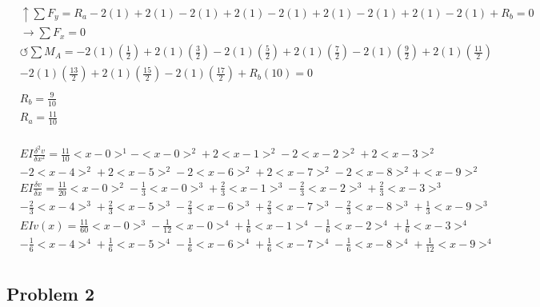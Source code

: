 \documentclass[a4paper]{article}
\begin{document}
\begin{equation}
\begin{split}
	&\uparrow \sum F_y = R_a - 2(1) + 2(1) - 2(1) + 2(1) - 2(1) + 2(1) - 2(1) + 2(1) - 2(1) + R_b = 0 \\
 	&\rightarrow \sum F_x = 0 \\
 	&\circlearrowleft \sum M_A = -2(1)\left(\frac{1}{2}\right) + 2(1)\left(\frac{3}{2}\right) - 2(1)\left(\frac{5}{2}\right) + 2(1)\left(\frac{7}{2}\right) - 2(1)\left(\frac{9}{2}\right) + 2(1)\left(\frac{11}{2}\right) \\ 
	& - 2(1)\left(\frac{13}{2}\right) + 2(1)\left(\frac{15}{2}\right) - 2(1)\left(\frac{17}{2}\right) + R_b(10) = 0 \\
	& \\
	& R_b = \frac{9}{10} \\
	& R_a = \frac{11}{10} \\
\end{split}
\label{problem1_reaction_solution}
\end{equation}

\begin{equation}
    \begin{split}
    & EI \frac{\delta^2 v}{\delta x^2} = \frac{11}{10}<x-0>^1 - <x-0>^2 +  2<x-1>^2 - 2<x-2>^2 +  2<x-3>^2 \\
    & - 2<x-4>^2  +  2<x-5>^2 - 2<x-6>^2  +  2<x-7>^2 - 2<x-8>^2 +  <x-9>^2  \\
    & EI \frac{\delta v}{\delta x} =  \frac{11}{20}<x-0>^2 - \frac{1}{3}<x-0>^3 +  \frac{2}{3}<x-1>^3 - \frac{2}{3}<x-2>^3 +  \frac{2}{3}<x-3>^3 \\
    & - \frac{2}{3}<x-4>^3  +  \frac{2}{3}<x-5>^3 - \frac{2}{3}<x-6>^3  +  \frac{2}{3}<x-7>^3 - \frac{2}{3}<x-8>^3 +  \frac{1}{3}<x-9>^3  \\
    & EI v(x) = \frac{11}{60}<x-0>^3 - \frac{1}{12}<x-0>^4 +  \frac{1}{6}<x-1>^4 - \frac{1}{6}<x-2>^4 +  \frac{1}{6}<x-3>^4 \\
    & - \frac{1}{6}<x-4>^4  +  \frac{1}{6}<x-5>^4 - \frac{1}{6}<x-6>^4  +  \frac{1}{6}<x-7>^4 - \frac{1}{6}<x-8>^4 +  \frac{1}{12}<x-9>^4  \\
    \end{split}
\label{problem1_equations}
\end{equation}

\subsection{Problem 2}
\end{document}
